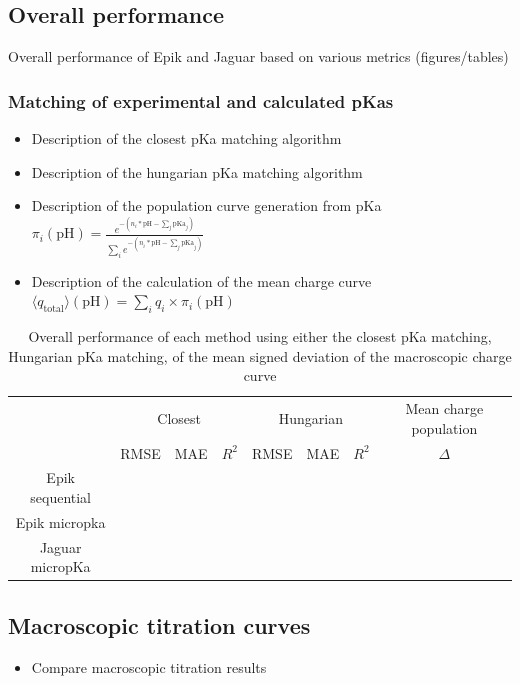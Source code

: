 \documentclass[9pt,lineno]{elife}
\newcommand{\pH}{\mathrm{pH}}
\newcommand{\pKa}{\mathrm{pKa}}
\begin{document}
\subsection{Overall performance}

Overall performance of Epik and Jaguar based on various metrics (figures/tables)
\subsubsection {Matching of experimental and calculated pKas}
\begin{itemize}
    \item Description of the closest pKa matching algorithm
    \item Description of the hungarian pKa matching algorithm
    \item Description of the population curve generation from pKa \\
    $ \pi_i(\pH) = \frac{e^{-(n_i*\pH - \sum_j \pKa_j)}}{\sum_i e^{-(n_i*\pH - \sum_j \pKa_j)} }$
    \item Description of the calculation of the mean charge curve \\
    $ \langle q_\text{total} \rangle (\pH) = \sum_i q_i \times \pi_i(\pH) $
\end{itemize}

\begin{table}[H]
\centering
\caption{Overall performance of each method using either the closest pKa matching, Hungarian pKa matching, of the mean signed deviation of the macroscopic charge curve}
\label{tab:overview-performance}
\begin{tabular}{c|ccc|ccc|c}
                & \multicolumn{3}{c|}{Closest} & \multicolumn{3}{c|}{Hungarian} & Mean charge population \\ \cline{2-8} 
          & RMSE     & MAE    & $R^2$    & RMSE     & MAE     & $R^2$     & $\Delta $                     \\ \hline
Epik sequential &          &        &          &          &         &           &                        \\
Epik micropka   &          &        &          &          &         &           &                        \\
Jaguar micropKa &          &        &          &          &         &           &                       
\end{tabular}
\end{table}

\subsection{Macroscopic titration curves}
\begin{itemize}
    \item Compare macroscopic titration results
\end{itemize}
\end{document}
